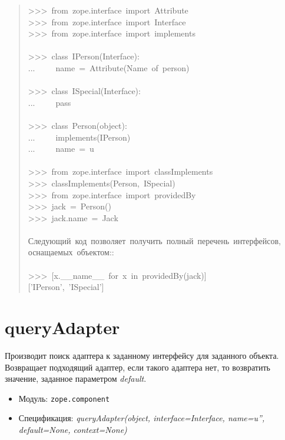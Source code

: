 \documentclass[14pt,a4paper,openany,twoside,final]{extbook}
\providecommand*{\DUroletitlereference}[1]{\textsl{#1}}
\begin{document}
\begin{quote}{\ttfamily \raggedright \noindent
>{}>{}>~from~zope.interface~import~Attribute\\
>{}>{}>~from~zope.interface~import~Interface\\
>{}>{}>~from~zope.interface~import~implements\\
~\\
>{}>{}>~class~IPerson(Interface):\\
...~~~~~name~=~Attribute(\textquotedbl{}Name~of~person\textquotedbl{})\\
~\\
>{}>{}>~class~ISpecial(Interface):\\
...~~~~~pass\\
~\\
>{}>{}>~class~Person(object):\\
...~~~~~implements(IPerson)\\
...~~~~~name~=~u\textquotedbl{}\textquotedbl{}\\
~\\
>{}>{}>~from~zope.interface~import~classImplements\\
>{}>{}>~classImplements(Person,~ISpecial)\\
>{}>{}>~from~zope.interface~import~providedBy\\
>{}>{}>~jack~=~Person()\\
>{}>{}>~jack.name~=~\textquotedbl{}Jack\textquotedbl{}\\
~\\
Следующий~код~позволяет~получить~полный~перечень~интерфейсов,\\
оснащаемых~объектом::\\
~\\
>{}>{}>~{[}x.\_\_name\_\_~for~x~in~providedBy(jack){]}\\
{[}'IPerson',~'ISpecial'{]}
}
\end{quote}


\section*{queryAdapter%
  \label{queryadapter}%
}

Производит поиск адаптера к заданному интерфейсу для заданного
объекта.  Возвращает подходящий адаптер, если такого адаптера нет, то
возвратить значение, заданное параметром \DUroletitlereference{default}.

\begin{itemize}

\item Модуль: \texttt{zope.component}

\item Спецификация: \DUroletitlereference{queryAdapter(object, interface=Interface, name=u'',
default=None, context=None)}

\end{itemize}
\end{document}
